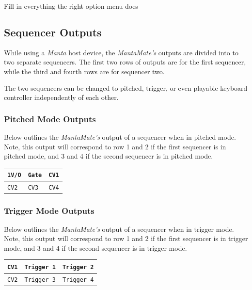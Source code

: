   Fill in everything the right option menu does

  \subsection{Sequencer Outputs}

  While using a \emph{Manta} host device, the \emph{MantaMate's} outputs are divided
  into to two separate sequencers. The first two rows of outputs are for the first
  sequencer, while the third and fourth rows are for sequencer two.

  The two sequencers can be changed to pitched, trigger, or even playable keyboard controller
  independently of each other.

  \subsubsection{Pitched Mode Outputs}

  Below outlines the \emph{MantaMate's} output of a sequencer when in pitched mode.
  Note, this output will correspond to row 1 and 2 if the first sequencer is in pitched
  mode, and 3 and 4 if the second sequencer is in pitched mode.


  \begin{center}
  \begin{tabular}{ | m{1.5cm} | m{1.5cm}| m{1.5cm} | }
    \hline
    \texttt{1V/O} & \texttt{Gate} & \texttt{CV1} \\
    \hline
    \texttt{CV2} & \texttt{CV3} & \texttt{CV4} \\
    \hline
  \end{tabular}
  \end{center}

  \subsubsection{Trigger Mode Outputs}
  Below outlines the \emph{MantaMate's} output of a sequencer when in trigger mode.
  Note, this output will correspond to row 1 and 2 if the first sequencer is in trigger
  mode, and 3 and 4 if the second sequencer is in trigger mode.

  \begin{center}
  \begin{tabular}{ | m{1.5cm} | m{1.5cm}| m{1.5cm} | }
    \hline
    \texttt{CV1} & \texttt{Trigger 1} & \texttt{Trigger 2} \\
    \hline
    \texttt{CV2} & \texttt{Trigger 3} & \texttt{Trigger 4} \\
    \hline
  \end{tabular}
  \end{center}


